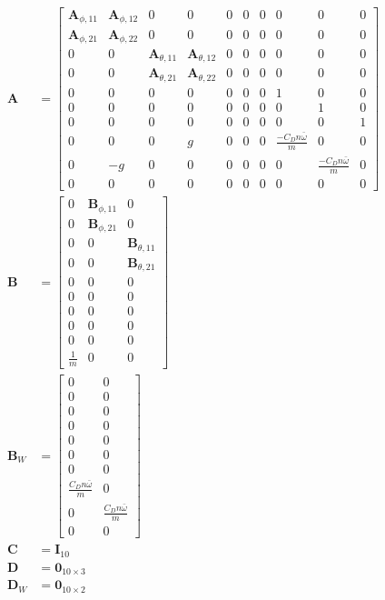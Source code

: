\begin{align}
\mathbf{A} &= \begin{bmatrix}
\mathbf{A}_{\phi,11} & \mathbf{A}_{\phi,12} & 0 & 0 & 0 & 0 & 0 & 0 & 0 & 0 \\
\mathbf{A}_{\phi,21} & \mathbf{A}_{\phi,22} & 0 & 0 & 0 & 0 & 0 & 0 & 0 & 0 \\
0 & 0 & \mathbf{A}_{\theta,11} & \mathbf{A}_{\theta,12} & 0 & 0 & 0 & 0 & 0 & 0  \\
0 & 0 & \mathbf{A}_{\theta,21} & \mathbf{A}_{\theta,22} & 0 & 0 & 0 & 0 & 0 & 0  \\
0 & 0 & 0 & 0 & 0 & 0 & 0 & 1 & 0 & 0 \\
0 & 0 & 0 & 0 & 0 & 0 & 0 & 0 & 1 & 0 \\
0 & 0 & 0 & 0 & 0 & 0 & 0 & 0 & 0 & 1 \\
0 & 0 & 0 & g & 0 & 0 & 0 & \frac{-C_D n \bar{\omega}}{m} & 0 & 0 \\
0 & -g & 0 & 0 & 0 & 0 & 0 & 0 & \frac{-C_D n \bar{\omega}}{m} & 0 \\
0 & 0 & 0 & 0 & 0 & 0 & 0 & 0 & 0 & 0 
\end{bmatrix} \\
\mathbf{B} &= \begin{bmatrix}
0 & \mathbf{B}_{\phi,11} & 0 \\
0 & \mathbf{B}_{\phi,21} & 0 \\
0 & 0 & \mathbf{B}_{\theta,11} \\
0 & 0 & \mathbf{B}_{\theta,21} \\
0 & 0 & 0 \\
0 & 0 & 0 \\
0 & 0 & 0 \\
0 & 0 & 0 \\
0 & 0 & 0 \\
\frac{1}{m} & 0 & 0
\end{bmatrix} \\
\mathbf{B}_W &= \begin{bmatrix}
0 & 0 \\
0 & 0 \\
0 & 0 \\
0 & 0 \\
0 & 0 \\
0 & 0 \\
0 & 0 \\
\frac{C_D n \bar{\omega}}{m} & 0 \\
0 & \frac{C_D n \bar{\omega}}{m} \\
0 & 0
\end{bmatrix} \\
\mathbf{C} &= \mathbf{I}_{10} \\
\mathbf{D} &= \mathbf{0}_{10\times3} \\
\mathbf{D}_W &= \mathbf{0}_{10\times2}
\end{align}

